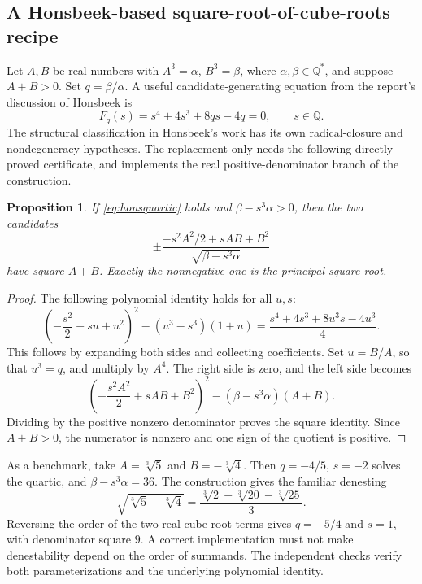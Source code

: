\documentclass[11pt,letterpaper]{article}
\newcommand{\Q}{\mathbb{Q}}
\newtheorem{proposition}[theorem]{Proposition}
\theoremstyle{definition}
\theoremstyle{remark}
\begin{document}
\subsection{A Honsbeek-based square-root-of-cube-roots recipe}\label{sec:honsbeek}

Let $A,B$ be real numbers with $A^3=\alpha$, $B^3=\beta$, where $\alpha,\beta\in\Q^*$, and suppose $A+B>0$. Set $q=\beta/\alpha$. A useful candidate-generating equation from the report's discussion of Honsbeek is
\begin{equation}\label{eq:honsquartic}
 F_q(s)=s^4+4s^3+8qs-4q=0,\qquad s\in\Q.
\end{equation}
The structural classification in Honsbeek's work has its own radical-closure and nondegeneracy hypotheses. The replacement only needs the following directly proved certificate, and implements the real positive-denominator branch of the construction.\cite{report}

\begin{proposition}\label{prop:honsbeek}
If \eqref{eq:honsquartic} holds and $\beta-s^3\alpha>0$, then the two candidates
\begin{equation}\label{eq:honscandidate}
 \pm\frac{-s^2A^2/2+sAB+B^2}{\sqrt{\beta-s^3\alpha}}
\end{equation}
have square $A+B$. Exactly the nonnegative one is the principal square root.
\end{proposition}
\begin{proof}
The following polynomial identity holds for all $u,s$:
\begin{equation}\label{eq:honsidentity}
 \left(-\frac{s^2}{2}+su+u^2\right)^2
 -(u^3-s^3)(1+u)
 =\frac{s^4+4s^3+8u^3s-4u^3}{4}.
\end{equation}
This follows by expanding both sides and collecting coefficients. Set $u=B/A$, so that $u^3=q$, and multiply by $A^4$. The right side is zero, and the left side becomes
\[
 \left(-\frac{s^2A^2}{2}+sAB+B^2\right)^2
 -(\beta-s^3\alpha)(A+B).
\]
Dividing by the positive nonzero denominator proves the square identity. Since $A+B>0$, the numerator is nonzero and one sign of the quotient is positive.
\end{proof}

As a benchmark, take $A=\sqrt[3]5$ and $B=-\sqrt[3]4$. Then $q=-4/5$, $s=-2$ solves the quartic, and $\beta-s^3\alpha=36$. The construction gives the familiar denesting
\begin{equation}\label{eq:ramanujan}
 \sqrt{\sqrt[3]5-\sqrt[3]4}
 =\frac{\sqrt[3]2+\sqrt[3]{20}-\sqrt[3]{25}}{3}.
\end{equation}
Reversing the order of the two real cube-root terms gives $q=-5/4$ and $s=1$, with denominator square $9$. A correct implementation must not make denestability depend on the order of summands. The independent checks verify both parameterizations and the underlying polynomial identity.
\end{document}
